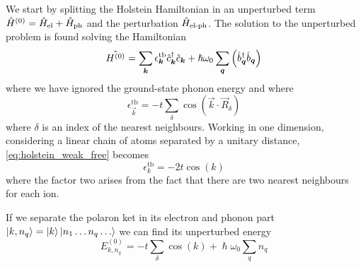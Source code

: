 We start by splitting the Holstein Hamiltonian in an unperturbed term $\hat{H}^{(0)} = \hat{H}_\text{el} + \hat{H}_\text{ph}$ and the perturbation $\hat{H}_\text{el-ph}$.
The solution to the unperturbed problem is found solving the Hamiltonian
\begin{equation}
    \hat{H^{(0)}} = \sum_{\mathbf{\boldsymbol{k}}} \epsilon_{\mathbf{\boldsymbol{k}}}^\text{tb} \hat{c}^\dagger_{\mathbf{\boldsymbol{k}}}\hat{c}_{\mathbf{\boldsymbol{k}}} + \hslash \omega_0\sum_{\mathbf{\boldsymbol{q}}}  \left( \hat{b}^\dagger_{\mathbf{\boldsymbol{q}}} \hat{b}_{\mathbf{\boldsymbol{q}}} \right)
\end{equation}
where we have ignored the ground-state phonon energy and where
\begin{equation} \label{eq:holstein_weak_free}
    \epsilon_\vec{k}^\text{tb} = -t \sum_{    \delta} \cos(\vec{k}\cdot\vec{R}_\delta)
\end{equation}
where $\delta$ is an index of the nearest neighbours. Working in one dimension, considering a linear chain of atoms separated by a unitary distance, \cref{eq:holstein_weak_free} becomes
\begin{equation} \label{eq:holstein_ground}
    \epsilon_k^\text{tb} = -2t \cos(k)
\end{equation}
where the factor two arises from the fact that there are two nearest neighbours for each ion.

If we separate the polaron ket in its electron and phonon part
$    \ket{k, n_q} = \ket{k}\ket{n_1\dots n_q \dots}$ we can find its unperturbed energy
\begin{equation}
    E_{k, n_q}^{(0)} = -t \sum_{    \delta} \cos(k) + \hslash\omega_0 \sum_q n_q
\end{equation}

